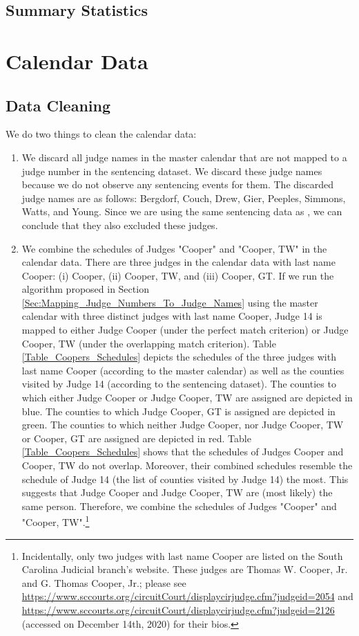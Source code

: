 \documentclass[11pt]{article}
\theoremstyle{ModifiedStyle}
\begin{document}
  \subsection{Summary Statistics}

\section{Calendar Data}
  \subsection{Data Cleaning}
    We do two things to clean the calendar data:

    \begin{enumerate}
      \item We discard all judge names in the master calendar that are not mapped to a judge number in the sentencing dataset. We discard these judge names because we do not observe any sentencing events for them. The discarded judge names are as follows: Bergdorf, Couch, Drew, Gier, Peeples, Simmons, Watts, and Young. Since we are using the same sentencing data as \cite{hester2017conditional}, we can conclude that they also excluded these judges.
    	\item We combine the schedules of Judges "Cooper" and "Cooper, TW" in the calendar data. There are three judges in the calendar data with last name Cooper: (i) Cooper, (ii) Cooper, TW, and (iii) Cooper, GT. If we run the algorithm proposed in Section \ref{Sec:Mapping_Judge_Numbers_To_Judge_Names} using the master calendar with three distinct judges with last name Cooper, Judge 14 is mapped to either Judge Cooper (under the perfect match criterion) or Judge Cooper, TW (under the overlapping match criterion). Table \ref{Table_Coopers_Schedules} depicts the schedules of the three judges with last name Cooper (according to the master calendar) as well as the counties visited by Judge 14 (according to the sentencing dataset). The counties to which either Judge Cooper or Judge Cooper, TW are assigned are depicted in blue. The counties to which Judge Cooper, GT is assigned are depicted in green. The counties to which neither Judge Cooper, nor Judge Cooper, TW or Cooper, GT are assigned are depicted in red. Table \ref{Table_Coopers_Schedules} shows that the schedules of Judges Cooper and Cooper, TW do not overlap. Moreover, their combined schedules resemble the schedule of Judge 14 (the list of counties visited by Judge 14) the most. This suggests that Judge Cooper and Judge Cooper, TW are (most likely) the same person. Therefore, we combine the schedules of Judges "Cooper" and "Cooper, TW".\footnote{Incidentally, only two judges with last name Cooper are listed on the South Carolina Judicial branch's website. These judges are Thomas W. Cooper, Jr. and G. Thomas Cooper, Jr.; please see \url{https://www.sccourts.org/circuitCourt/displaycirjudge.cfm?judgeid=2054} and \url{https://www.sccourts.org/circuitCourt/displaycirjudge.cfm?judgeid=2126} (accessed on December 14th, 2020) for their bios.}
    \end{enumerate}
\end{document}
